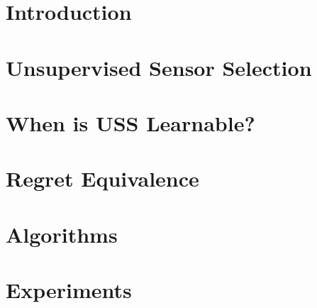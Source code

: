 \documentclass[10pt]{article}
\begin{document}
\section{Introduction}
\vspace{-6pt}


%

\section{Unsupervised Sensor Selection}
\label{sec:Setup}


\section{When is USS Learnable?}
\label{sec:Learnability}


%

\section{Regret Equivalence}
\label{sec:Equiv}
\vspace{-6pt}


\vspace{-5pt}
\section{Algorithms}
\label{sec:Algo}


\section{Experiments}
\label{sec:Experiments}


\vspace{-10pt}
\end{document}
